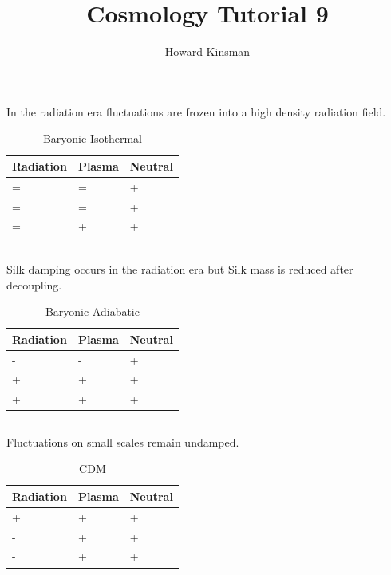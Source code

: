 \documentclass[a4paper,12pt]{article}
\author{Howard Kinsman}
\title{Cosmology Tutorial 9}
\begin{document}
\maketitle
\section{}
\subsection{}
In the radiation era fluctuations are frozen into a high density radiation field.
\begin{table}[ht]
\centering
\begin{tabular}{|l|l|l|}
\hline
Radiation & Plasma & Neutral \\
\hline
= & = & + \\
= & = & + \\
= & + & + \\
\hline
\end{tabular}
\caption{\label{tab:task1}Baryonic Isothermal}
\end{table}
\subsection{}
Silk damping occurs in the radiation era but Silk mass is reduced after decoupling.
\begin{table}[ht]
\centering
\begin{tabular}{|l|l|l|}
\hline
Radiation & Plasma & Neutral \\
\hline
- & - & + \\
+ & + & + \\
+ & + & + \\
\hline
\end{tabular}
\caption{\label{tab:task2}Baryonic Adiabatic}
\end{table}
\subsection{}
Fluctuations on small scales remain undamped.
\begin{table}[ht]
\centering
\begin{tabular}{|l|l|l|}
\hline
Radiation & Plasma & Neutral \\
\hline
+ & + & + \\
- & + & + \\
- & + & + \\
\hline
\end{tabular}
\caption{\label{tab:task3}CDM}
\end{table}
\end{document}
